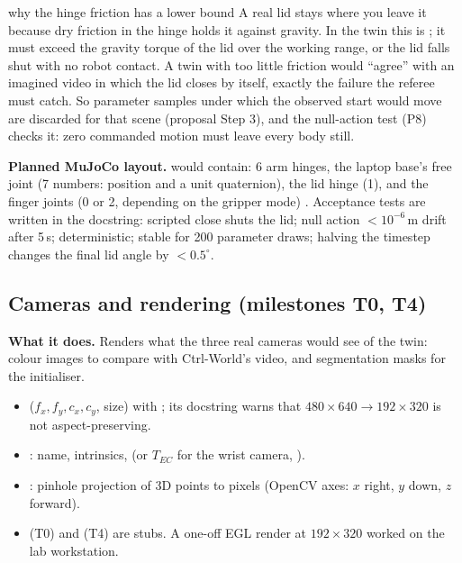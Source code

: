 \begin{newc}{why the hinge friction has a lower bound}
A real lid stays where you leave it because dry friction in the hinge holds it against gravity. In the twin this is ; it must exceed the gravity torque of the lid over the working range, or the lid falls shut with no robot contact. A twin with too little friction would ``agree'' with an imagined video in which the lid closes by itself, exactly the failure the referee must catch. So parameter samples under which the observed start would move are discarded for that scene (proposal Step 3), and the null-action test (P8) checks it: zero commanded motion must leave every body still.
\end{newc}

\textbf{Planned MuJoCo layout.}  would contain: 6 arm hinges, the laptop base's free joint (7 numbers: position and a unit quaternion), the lid hinge (1), and the finger joints (0 or 2, depending on the gripper mode) \planned. Acceptance tests are written in the  docstring: scripted close shuts the lid; null action $<10^{-6}$\,m drift after 5\,s; deterministic; stable for 200 parameter draws; halving the timestep changes the final lid angle by $<0.5^\circ$.

\subsection{Cameras and rendering (milestones T0, T4) \skel}\label{twin:sec:render}
\textbf{What it does.} Renders what the three real cameras would see of the twin: colour images to compare with Ctrl-World's video, and segmentation masks for the initialiser.

\begin{incode}
\begin{itemize}[leftmargin=*]
\item {} ($f_x,f_y,c_x,c_y$, size) with ; its docstring warns that $480\times640\to192\times320$ is not aspect-preserving.
\item {}: name, intrinsics,  (or $T_{EC}$ for the wrist camera, ).
\item {}: pinhole projection of 3D points to pixels (OpenCV axes: $x$ right, $y$ down, $z$ forward).
\item {} (T0) and  (T4) are stubs. A one-off EGL render at $192\times320$ worked on the lab workstation.
\end{itemize}
\end{incode}

